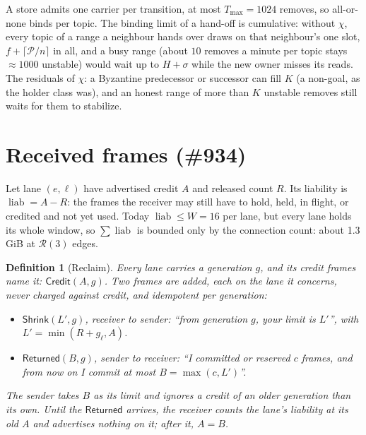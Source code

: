 \documentclass[journal]{IEEEtran}
\newtheorem{definition}{Definition}
\newcommand{\Rg}{\mathcal{R}}
\newcommand{\Pool}{\mathcal{P}}
\newcommand{\liab}{\operatorname{liab}}
\newcommand{\issue}[1]{\#{#1}}
\begin{document}
A store admits one carrier per transition, at most $T_{\max}=1024$ removes, so all-or-none
binds per topic.  The binding limit of a hand-off is cumulative: without $\chi$, every topic of
a range a neighbour hands over draws on that neighbour's one slot, $f+\lceil\Pool/n\rceil$ in
all, and a busy range (about $10$ removes a minute per topic stays $\approx1000$ unstable) would
wait up to $H+\sigma$ while the new owner misses its reads.  The residuals of $\chi$: a
Byzantine predecessor or successor can fill $K$ (a non-goal, as the holder class was), and an
honest range of more than $K$ unstable removes still waits for them to stabilize.

\section{Received frames (\issue{934})}\label{sec:frames}

Let lane $(e,\ell)$ have advertised credit $A$ and released count $R$.  Its liability is
$\liab=A-R$: the frames the receiver may still have to hold, held, in flight, or credited and
not yet used.  Today $\liab\le W=16$ per lane, but every lane holds its whole window, so
$\sum\liab$ is bounded only by the connection count: about 1.3\,GiB at $\Rg(3)$ edges.

\begin{definition}[Reclaim]\label{def:reclaim}
Every lane carries a generation $g$, and its credit frames name it: $\mathsf{Credit}(A,g)$.  Two
frames are added, each on the lane it concerns, never charged against credit, and idempotent
per generation:
\begin{itemize}[leftmargin=1.2em]
\item $\mathsf{Shrink}(L',g)$, receiver to sender: ``from generation $g$, your limit is $L'$'',
with $L'=\min(R+g_\ell,A)$.
\item $\mathsf{Returned}(B,g)$, sender to receiver: ``I committed or reserved $c$ frames, and
from now on I commit at most $B=\max(c,L')$''.
\end{itemize}
The sender takes $B$ as its limit and ignores a credit of an older generation than its own.
Until the
$\mathsf{Returned}$ arrives, the receiver counts the lane's liability at its old $A$ and
advertises nothing on it; after it, $A=B$.
\end{definition}
\end{document}
